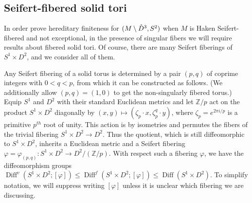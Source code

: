 \documentclass{amsart}
\theoremstyle{plain}
\theoremstyle{definition}
\DeclareMathOperator\Diff{Diff}
\newcommand{\interior}[1]{\smash{\mathring{#1}}}
\newcommand{\Z}{\mathbb{Z}}
\begin{document}
\subsection{Seifert-fibered solid tori}\label{subsection: SF solid torus}
In order prove hereditary finiteness for $(M \setminus \interior{D}^3, S^2)$ when $M$ is Haken Seifert-fibered and not exceptional, in the presence of singular fibers we will require results about fibered solid tori. Of course, there are many Seifert fiberings of $S^1\times D^2$, and we consider all of them.

Any Seifert fibering of a solid torus is determined by a pair $(p,q)$ of coprime integers with $0<q<p$, from which it can be constructed as follows. 
(We additionally allow $(p,q) = (1,0)$ to get the non-singularly fibered torus.)
Equip $S^1$ and $D^2$ with their standard Euclidean metrics and let $\Z/p$ act on the product $S^1\times D^2$ diagonally by $(x,y)\mapsto (\zeta_p\cdot x,\zeta_p^q\cdot y)$, where $\zeta_p=e^{2\pi i/p}$ is a primitive $p^{th}$ root of unity.
This action is by isometries and permutes the fibers of the trivial fibering $S^1\times D^2\rightarrow D^2$.
Thus the quotient, which is still diffeomorphic to $S^1\times D^2$, inherits a Euclidean metric and a Seifert fibering $\varphi=\varphi_{(p,q)}\colon S^1\times D^2\rightarrow D^2/(\Z/p)$.
With respect such a fibering $\varphi$, we have the diffeomorphism groups 
$\Diff^v(S^1 \times D^2; [\varphi]) \le \Diff^f(S^1\times D^2;[\varphi]) \le \Diff(S^1 \times D^2)$.
To simplify notation, we will suppress writing $[\varphi]$ unless it is unclear which fibering we are discussing.
\end{document}
